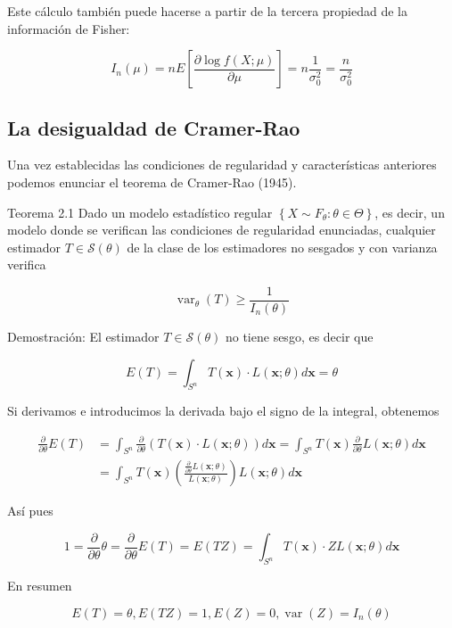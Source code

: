\documentclass[
]{article}
\begin{document}
Este cálculo también puede hacerse a partir de la tercera propiedad de la información de Fisher:

\[
I_{n}(\mu)=n E\left[\frac{\partial \log f(X ; \mu)}{\partial \mu}\right]=n \frac{1}{\sigma_{0}^{2}}=\frac{n}{\sigma_{0}^{2}}
\]

\subsection{La desigualdad de Cramer-Rao}\label{la-desigualdad-de-cramer-rao}

Una vez establecidas las condiciones de regularidad y características anteriores podemos enunciar el teorema de Cramer-Rao (1945).

Teorema 2.1 Dado un modelo estadístico regular \(\left\{X \sim F_{\theta}: \theta \in \Theta\right\}\), es decir, un modelo donde se verifican las condiciones de regularidad enunciadas, cualquier estimador \(T \in \mathcal{S}(\theta)\) de la clase de los estimadores no sesgados y con varianza verifica

\[
\operatorname{var}_{\theta}(T) \geq \frac{1}{I_{n}(\theta)}
\]

Demostración:
El estimador \(T \in \mathcal{S}(\theta)\) no tiene sesgo, es decir que

\[
E(T)=\int_{S^{n}} T(\mathbf{x}) \cdot L(\mathbf{x} ; \theta) d \mathbf{x}=\theta
\]

Si derivamos e introducimos la derivada bajo el signo de la integral, obtenemos

\[
\begin{aligned}
\frac{\partial}{\partial \theta} E(T) & =\int_{S^{n}} \frac{\partial}{\partial \theta}(T(\mathbf{x}) \cdot L(\mathbf{x} ; \theta)) d \mathbf{x}=\int_{S^{n}} T(\mathbf{x}) \frac{\partial}{\partial \theta} L(\mathbf{x} ; \theta) d \mathbf{x} \\
& =\int_{S^{n}} T(\mathbf{x})\left(\frac{\frac{\partial}{\partial \theta} L(\mathbf{x} ; \theta)}{L(\mathbf{x} ; \theta)}\right) L(\mathbf{x} ; \theta) d \mathbf{x}
\end{aligned}
\]

Así pues

\[
1=\frac{\partial}{\partial \theta} \theta=\frac{\partial}{\partial \theta} E(T)=E(T Z)=\int_{S^{n}} T(\mathbf{x}) \cdot Z L(\mathbf{x} ; \theta) d \mathbf{x}
\]

En resumen

\[
E(T)=\theta, E(T Z)=1, E(Z)=0, \operatorname{var}(Z)=I_{n}(\theta)
\]
\end{document}
